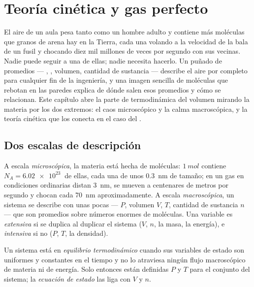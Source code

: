 \chapter{Teoría cinética y gas perfecto}\label{ch:b1:kinetic-theory}

El aire de un aula pesa tanto como un hombre adulto y contiene más
moléculas que granos de arena hay en la Tierra, cada una volando a la
velocidad de la bala de un fusil y chocando diez mil millones de veces por
segundo con sus vecinas. Nadie puede seguir a una de ellas; nadie
necesita hacerlo. Un puñado de promedios --- , ,
volumen, cantidad de sustancia --- describe el aire por completo para
cualquier fin de la ingeniería, y una imagen sencilla de moléculas que
rebotan en las paredes explica de dónde salen esos promedios y cómo se
relacionan. Este capítulo abre la parte de termodinámica del volumen
mirando la materia por los dos extremos: el caos microscópico y la calma
macroscópica, y la teoría cinética que los conecta en el caso del .

\section{Dos escalas de descripción}

\begin{definition}\label{def:b1:kinetic-theory:scales}
A escala \emph{microscópica}, la materia está hecha de moléculas:
$\qty{1}{mol}$ contiene $N_A = \qty{6.02e23}{}$ de ellas, cada una de unos
\qty{0.3}{nm} de tamaño; en un gas en condiciones ordinarias distan
\qty{3}{nm}, se mueven a centenares de metros por segundo y chocan cada
\qty{70}{nm} aproximadamente. A escala \emph{macroscópica}, un sistema se
describe con unas pocas \emph{} ---  $P$,
volumen $V$,  $T$, cantidad de sustancia $n$ --- que son
promedios sobre números enormes de moléculas. Una variable es
\emph{extensiva} si se duplica al duplicar el sistema ($V$, $n$, la masa,
la energía), e \emph{intensiva} si no ($P$, $T$, la densidad).
\end{definition}

\begin{definition}\label{def:b1:kinetic-theory:equilibrium}
Un sistema está en \emph{equilibrio termodinámico} cuando sus variables de
estado son uniformes y constantes en el tiempo y no lo atraviesa ningún
flujo macroscópico de materia ni de energía. Solo entonces están definidas
$P$ y $T$ para el conjunto del sistema; la \emph{ecuación de estado} las
liga con $V$ y $n$.
\end{definition}


